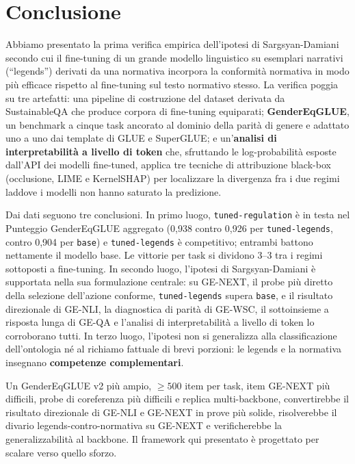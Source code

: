 \documentclass[pdflatex, sn-apa]{sn-jnl}%
\theoremstyle{thmstyleone}%
\theoremstyle{thmstyletwo}%
\theoremstyle{thmstylethree}%
\newcommand{\modelbase}{\texttt{base}}
\newcommand{\modellegends}{\texttt{tuned-legends}}
\newcommand{\modelreg}{\texttt{tuned-regulation}}
\begin{document}
\section{Conclusione}
\label{sec:conclusion}

Abbiamo presentato la prima verifica empirica dell'ipotesi di Sargsyan-Damiani
secondo cui il fine-tuning di un grande modello linguistico su esemplari narrativi
(``legends'') derivati da una normativa incorpora la conformità normativa in modo
più efficace rispetto al fine-tuning sul testo normativo stesso. La verifica poggia
su tre artefatti: una pipeline di costruzione del dataset derivata da SustainableQA
che produce corpora di fine-tuning equiparati; \textbf{GenderEqGLUE}, un benchmark
a cinque task ancorato al dominio della parità di genere e adattato uno a uno dai
template di GLUE e SuperGLUE; e un'\textbf{analisi di interpretabilità a livello di
token} che, sfruttando le log-probabilità esposte dall'API dei modelli fine-tuned,
applica tre tecniche di attribuzione black-box (occlusione, LIME e KernelSHAP) per
localizzare la divergenza fra i due regimi laddove i modelli non hanno saturato la
predizione.

Dai dati seguono tre conclusioni. In primo luogo, \modelreg{} è in testa nel
Punteggio GenderEqGLUE aggregato (0,938 contro 0,926 per \modellegends, contro
0,904 per \modelbase) e \modellegends{} è competitivo; entrambi battono nettamente
il modello base. Le vittorie per task si dividono 3--3 tra i regimi sottoposti a
fine-tuning. In secondo luogo, l'ipotesi di Sargsyan-Damiani è supportata nella sua
formulazione centrale: su GE-NEXT, il probe più diretto della selezione dell'azione
conforme, \modellegends{} supera \modelbase{}, e il risultato direzionale di
GE-NLI, la diagnostica di parità di GE-WSC, il sottoinsieme a risposta lunga di
GE-QA e l'analisi di interpretabilità a livello di token lo corroborano tutti. In
terzo luogo, l'ipotesi non si generalizza alla classificazione dell'ontologia né al
richiamo fattuale di brevi porzioni: le legends e la normativa insegnano
\textbf{competenze complementari}.

Un GenderEqGLUE v2 più ampio, $\geq 500$ item per task, item GE-NEXT più difficili,
probe di coreferenza più difficili e replica multi-backbone, convertirebbe il
risultato direzionale di GE-NLI e GE-NEXT in prove più solide, risolverebbe il
divario legends-contro-normativa su GE-NEXT e verificherebbe la generalizzabilità
al backbone. Il framework qui presentato è progettato per scalare verso quello
sforzo.
\end{document}
